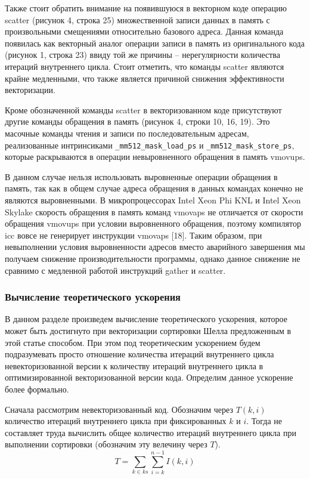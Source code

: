 Также стоит обратить внимание на появившуюся в векторном коде операцию scatter (рисунок 4, строка 25) множественной записи данных в память с произвольными смещениями относительно базового адреса.
Данная команда появилась как векторный аналог операции записи в память из оригинального кода (рисунок 1, строка 23) ввиду той же причины – нерегулярности количества итераций внутреннего цикла.
Стоит отметить, что команды scatter являются крайне медленными, что также является причиной снижения эффективности векторизации.

Кроме обозначенной команды scatter в векторизованном коде присутствуют другие команды обращения в память (рисунок 4, строки 10, 16, 19).
Это масочные команды чтения и записи по последовательным адресам, реализованные интринсиками \texttt{\_mm512\_mask\_load\_ps} и \texttt{\_mm512\_mask\_store\_ps}, которые раскрываются в операции невыровненного обращения в память vmovups.

В данном случае нельзя использовать выровненные операции обращения в память, так как в общем случае адреса обращения в данных командах конечно не являются выровненными.
В микропроцессорах Intel Xeon Phi KNL и Intel Xeon Skylake скорость обращения в память команд vmovaps не отличается от скорости обращения vmovups при условии выровненного обращения, поэтому компилятор icc вовсе не генерирует инструкции vmovaps [18].
Таким образом, при невыполнении условия выровненности адресов вместо аварийного завершения мы получаем снижение производительности программы, однако данное снижение не сравнимо с медленной работой инструкций gather и scatter.

\subsubsection{Вычисление теоретического ускорения}

В данном разделе произведем вычисление теоретического ускорения, которое может быть достигнуто при векторизации сортировки Шелла предложенным в этой статье способом. 
При этом под теоретическим ускорением будем подразумевать просто отношение количества итераций внутреннего цикла невекторизованной версии к количеству итераций внутреннего цикла в оптимизированной векторизованной версии кода. Определим данное ускорение более формально.

Сначала рассмотрим невекторизованный код. Обозначим через $T(k, i)$ количество итераций внутреннего цикла при фиксированных $k$ и $i$. 
Тогда не составляет труда вычислить общее количество итераций внутреннего цикла при выполнении сортировки (обозначим эту велечину через $T$).
\begin{equation}
	T = \sum_{k \in ks}{\sum_{i = k}^{n - 1}{I(k, i)}}
\end{equation}

